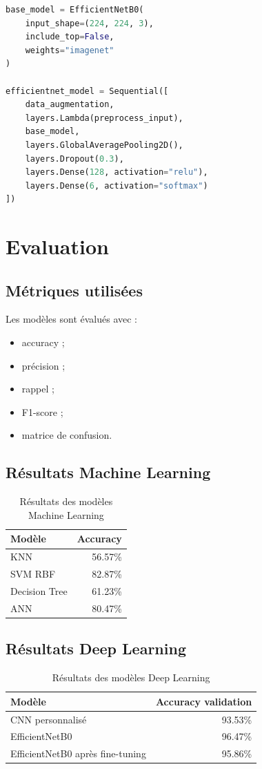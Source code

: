 \documentclass[12pt,a4paper]{report}
\begin{document}
\begin{lstlisting}[language=Python, caption={Structure utilisée avec EfficientNetB0}]
base_model = EfficientNetB0(
    input_shape=(224, 224, 3),
    include_top=False,
    weights="imagenet"
)

efficientnet_model = Sequential([
    data_augmentation,
    layers.Lambda(preprocess_input),
    base_model,
    layers.GlobalAveragePooling2D(),
    layers.Dropout(0.3),
    layers.Dense(128, activation="relu"),
    layers.Dense(6, activation="softmax")
])
\end{lstlisting}

\chapter{Evaluation}

\section{Métriques utilisées}
Les modèles sont évalués avec :
\begin{itemize}
  \item accuracy ;
  \item précision ;
  \item rappel ;
  \item F1-score ;
  \item matrice de confusion.
\end{itemize}

\section{Résultats Machine Learning}
\begin{table}[H]
\centering
\caption{Résultats des modèles Machine Learning}
\begin{tabular}{lr}
\toprule
\textbf{Modèle} & \textbf{Accuracy} \\
\midrule
KNN & 56.57\% \\
SVM RBF & 82.87\% \\
Decision Tree & 61.23\% \\
ANN & 80.47\% \\
\bottomrule
\end{tabular}
\end{table}

\section{Résultats Deep Learning}
\begin{table}[H]
\centering
\caption{Résultats des modèles Deep Learning}
\begin{tabular}{lr}
\toprule
\textbf{Modèle} & \textbf{Accuracy validation} \\
\midrule
CNN personnalisé & 93.53\% \\
EfficientNetB0 & 96.47\% \\
EfficientNetB0 après fine-tuning & 95.86\% \\
\bottomrule
\end{tabular}
\end{table}
\end{document}
